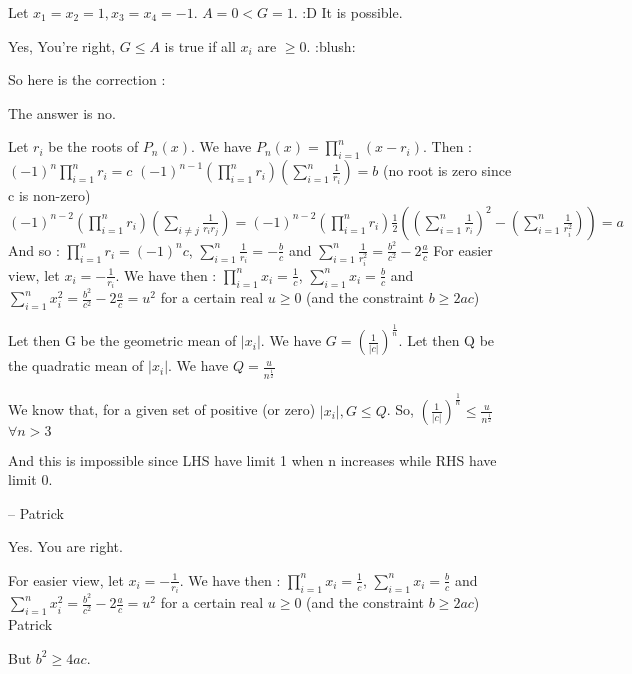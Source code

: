 \begin{solution}
	\begin{tcolorbox} Let $x_{1}=x_{2}=1,x_{3}=x_{4}=-1$. $A=0<G=1$. :D 
It is possible.\end{tcolorbox}
Yes, You're right, $G\leq A$ is true if all $x_{i}$ are $\geq 0$.  :blush: 

So here is the correction :

The answer is no.

Let $r_{i}$ be the roots of $P_{n}(x)$. We have $P_{n}(x)=\prod_{i=1}^{n}(x-r_{i})$. Then :
$(-1)^{n}\prod_{i=1}^{n}r_{i}=c$
$(-1)^{n-1}(\prod_{i=1}^{n}r_{i})(\sum_{i=1}^{n}\frac{1}{r_{i}})=b$  (no root is zero since c is non-zero)
$(-1)^{n-2}(\prod_{i=1}^{n}r_{i})(\sum_{i\neq j}\frac{1}{r_{i}r_{j}})=(-1)^{n-2}(\prod_{i=1}^{n}r_{i})\frac{1}{2}( (\sum_{i=1}^{n}\frac{1}{r_{i}})^{2}-(\sum_{i=1}^{n}\frac{1}{r_{i}^{2}}))=a$
And so :
$\prod_{i=1}^{n}r_{i}=(-1)^{n}c$,    $\sum_{i=1}^{n}\frac{1}{r_{i}}=-\frac{b}{c}$  and $\sum_{i=1}^{n}\frac{1}{r_{i}^{2}}=\frac{b^{2}}{c^{2}}-2\frac{a}{c}$
For easier view, let $x_{i}=-\frac{1}{r_{i}}$. We have then :
$\prod_{i=1}^{n}x_{i}=\frac{1}{c}$,    $\sum_{i=1}^{n}x_{i}=\frac{b}{c}$  and $\sum_{i=1}^{n}x_{i}^{2}=\frac{b^{2}}{c^{2}}-2\frac{a}{c}=u^{2}$ for a certain real $u\geq 0$ (and the constraint $b\geq 2ac$)

Let then G be the geometric mean of $|x_{i}|$. We have $G=(\frac{1}{|c|})^{\frac{1}{n}}$.
Let then Q be the quadratic mean of $|x_{i}|$. We have $Q=\frac{u}{n^{\frac{1}{2}}}$

We know that, for a given set of positive (or zero)  $|x_{i}|, G\leq Q$. So, $(\frac{1}{|c|})^{\frac{1}{n}}\leq \frac{u}{n^{\frac{1}{2}}}$ $\forall n>3$

And this is impossible since LHS have limit 1 when n increases while RHS have limit 0.

-- 
Patrick
\end{solution}



\begin{solution}
	Yes. You are right.
\begin{tcolorbox} For easier view, let $x_{i}=-\frac{1}{r_{i}}$. We have then :
$\prod_{i=1}^{n}x_{i}=\frac{1}{c}$,    $\sum_{i=1}^{n}x_{i}=\frac{b}{c}$  and $\sum_{i=1}^{n}x_{i}^{2}=\frac{b^{2}}{c^{2}}-2\frac{a}{c}=u^{2}$ for a certain real $u\geq 0$ (and the constraint $b\geq 2ac$)
Patrick\end{tcolorbox}
But $b^{2}\ge 4ac .$
\end{solution}



